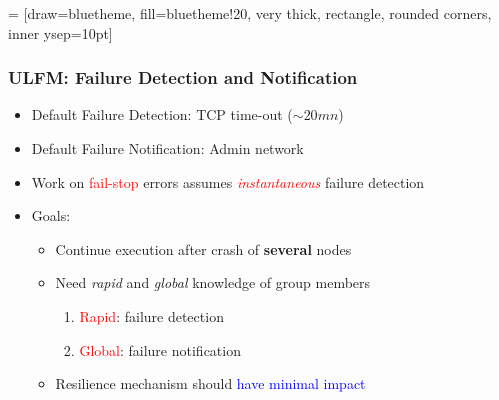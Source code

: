  = [draw=bluetheme, fill=bluetheme!20, very thick, rectangle, rounded corners, inner ysep=10pt]


\begin{frame}
  \frametitle{ULFM: Failure Detection and Notification}
  \begin{itemize}
  \item Default Failure Detection: TCP time-out ($\sim 20mn$)
  \item Default Failure Notification: Admin network
  \item Work on \textcolor{red}{fail-stop} errors assumes  \textcolor{red}{\emph{instantaneous}} failure detection
  \item Goals:
    \begin{itemize}
    \item Continue execution after crash of \textbf{several} nodes
    \item Need \emph{rapid} and \emph{global} knowledge of group members
      \begin{enumerate}
      \item \textcolor{red}{Rapid}: failure detection
      \item \textcolor{red}{Global}: failure notification
      \end{enumerate}
    \item Resilience mechanism should \textcolor{blue}{have minimal impact}
    \end{itemize}
  \end{itemize}
\end{frame}


